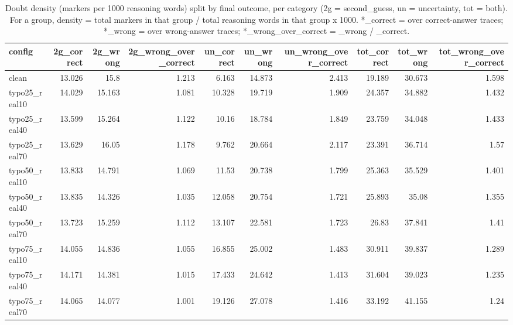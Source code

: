 \documentclass[11pt]{article}
\begin{document}
\begin{table}[H]
\centering
\caption{Doubt density (markers per 1000 reasoning words) split by final outcome, per category (2g = second\_guess, un = uncertainty, tot = both). For a group, density = total markers in that group / total reasoning words in that group x 1000. *\_correct = over correct-answer traces; *\_wrong = over wrong-answer traces; *\_wrong\_over\_correct = \_wrong / \_correct.}
\small
\begin{adjustbox}{max width=\textwidth}
\begin{tabular}{lrrrrrrrrr}
\toprule
\textbf{config} & \textbf{2g\_correct} & \textbf{2g\_wrong} & \textbf{2g\_wrong\_over\_correct} & \textbf{un\_correct} & \textbf{un\_wrong} & \textbf{un\_wrong\_over\_correct} & \textbf{tot\_correct} & \textbf{tot\_wrong} & \textbf{tot\_wrong\_over\_correct} \\
\midrule
clean & 13.026 & 15.8 & 1.213 & 6.163 & 14.873 & 2.413 & 19.189 & 30.673 & 1.598 \\
typo25\_real10 & 14.029 & 15.163 & 1.081 & 10.328 & 19.719 & 1.909 & 24.357 & 34.882 & 1.432 \\
typo25\_real40 & 13.599 & 15.264 & 1.122 & 10.16 & 18.784 & 1.849 & 23.759 & 34.048 & 1.433 \\
typo25\_real70 & 13.629 & 16.05 & 1.178 & 9.762 & 20.664 & 2.117 & 23.391 & 36.714 & 1.57 \\
typo50\_real10 & 13.833 & 14.791 & 1.069 & 11.53 & 20.738 & 1.799 & 25.363 & 35.529 & 1.401 \\
typo50\_real40 & 13.835 & 14.326 & 1.035 & 12.058 & 20.754 & 1.721 & 25.893 & 35.08 & 1.355 \\
typo50\_real70 & 13.723 & 15.259 & 1.112 & 13.107 & 22.581 & 1.723 & 26.83 & 37.841 & 1.41 \\
typo75\_real10 & 14.055 & 14.836 & 1.055 & 16.855 & 25.002 & 1.483 & 30.911 & 39.837 & 1.289 \\
typo75\_real40 & 14.171 & 14.381 & 1.015 & 17.433 & 24.642 & 1.413 & 31.604 & 39.023 & 1.235 \\
typo75\_real70 & 14.065 & 14.077 & 1.001 & 19.126 & 27.078 & 1.416 & 33.192 & 41.155 & 1.24 \\
\bottomrule
\end{tabular}
\end{adjustbox}
\end{table}
\end{document}
